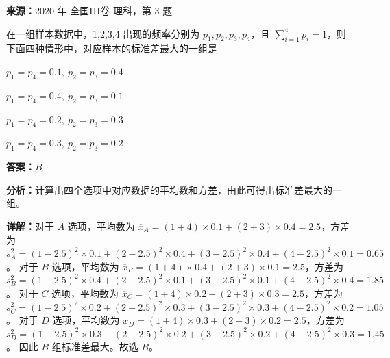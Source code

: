 \begin{question}[points=5]
\textbf{来源：}2020 年 全国III卷-理科，第 3 题\par
在一组样本数据中，1,2,3,4 出现的频率分别为 $p_1,p_2,p_3,p_4$，且 $\sum\limits_{i=1}^4 p_i=1$，则下面四种情形中，对应样本的标准差最大的一组是
\begin{choices}
  \item $p_1=p_4=0.1,\ p_2=p_3=0.4$
  \item $p_1=p_4=0.4,\ p_2=p_3=0.1$
  \item $p_1=p_4=0.2,\ p_2=p_3=0.3$
  \item $p_1=p_4=0.3,\ p_2=p_3=0.2$
\end{choices}
\begin{solution}
\textbf{答案：}$B$

\textbf{分析：}计算出四个选项中对应数据的平均数和方差，由此可得出标准差最大的一组。

\textbf{详解：}对于 $A$ 选项，平均数为 $\overline{x}_A=(1+4)\times 0.1+(2+3)\times 0.4=2.5$，方差为 $s_A^2=(1-2.5)^2\times0.1+(2-2.5)^2\times0.4+(3-2.5)^2\times0.4+(4-2.5)^2\times0.1=0.65$。
对于 $B$ 选项，平均数为 $\overline{x}_B=(1+4)\times0.4+(2+3)\times0.1=2.5$，方差为 $s_B^2=(1-2.5)^2\times0.4+(2-2.5)^2\times0.1+(3-2.5)^2\times0.1+(4-2.5)^2\times0.4=1.85$。
对于 $C$ 选项，平均数为 $\overline{x}_C=(1+4)\times0.2+(2+3)\times0.3=2.5$，方差为 $s_C^2=(1-2.5)^2\times0.2+(2-2.5)^2\times0.3+(3-2.5)^2\times0.3+(4-2.5)^2\times0.2=1.05$。
对于 $D$ 选项，平均数为 $\overline{x}_D=(1+4)\times0.3+(2+3)\times0.2=2.5$，方差为 $s_D^2=(1-2.5)^2\times0.3+(2-2.5)^2\times0.2+(3-2.5)^2\times0.2+(4-2.5)^2\times0.3=1.45$。
因此 $B$ 组标准差最大。故选 $B$。
\end{solution}
\end{question}

